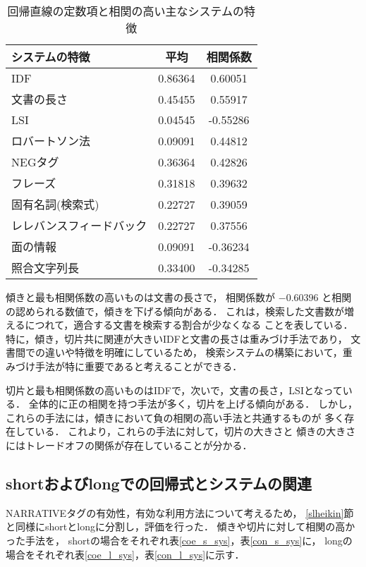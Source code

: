 \begin{table}[htb]
\renewcommand{\arraystretch}{}
\caption{回帰直線の定数項と相関の高い主なシステムの特徴}
\centering
\small
\label{con_sys}
\begin{tabular}{lcc} 
システムの特徴 		&   平均  & 相関係数\\ \hline
IDF		 	& 0.86364 &  0.60051\\
文書の長さ		& 0.45455 &  0.55917\\
LSI	 		& 0.04545 & -0.55286\\
ロバートソン法  	& 0.09091 &  0.44812\\
NEGタグ 		& 0.36364 &  0.42826\\
フレーズ 		& 0.31818 &  0.39632\\
固有名詞(検索式)	& 0.22727 &  0.39059\\
レレバンスフィードバック& 0.22727 &  0.37556\\
面の情報	 	& 0.09091 & -0.36234\\
照合文字列長		& 0.33400 & -0.34285\\ \hline
\end{tabular}
\end{table}

傾きと最も相関係数の高いものは文書の長さで，
相関係数が $-0.60396$ と相関の認められる数値で，傾きを下げる傾向がある．
これは，検索した文書数が増えるにつれて，適合する文書を検索する割合が少なくなる
ことを表している．
特に，傾き，切片共に関連が大きいIDFと文書の長さは重みづけ手法であり，
文書間での違いや特徴を明確にしているため，
検索システムの構築において，重みづけ手法が特に重要であると考えることができる．

切片と最も相関係数の高いものはIDFで，次いで，文書の長さ，LSIとなっている．
全体的に正の相関を持つ手法が多く，切片を上げる傾向がある．
しかし，これらの手法には，傾きにおいて負の相関の高い手法と共通するものが
多く存在している．
これより，これらの手法に対して，切片の大きさと
傾きの大きさにはトレードオフの関係が存在していることが分かる．


\clearpage
\subsection{shortおよびlongでの回帰式とシステムの関連}
NARRATIVEタグの有効性，有効な利用方法について考えるため，
\ref{slheikin}節と同様にshortとlongに分割し，評価を行った．
傾きや切片に対して相関の高かった手法を，
shortの場合をそれぞれ表\ref{coe_s_sys}，表\ref{con_s_sys}に，
longの場合をそれぞれ表\ref{coe_l_sys}，表\ref{con_l_sys}に示す．

